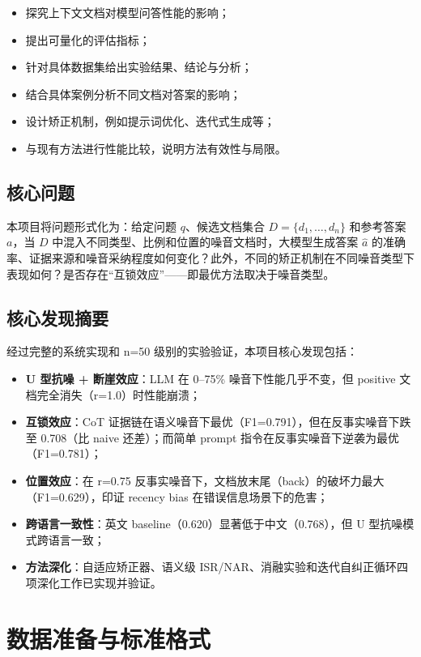 \documentclass[UTF8,zihao=-4]{ctexart}
\begin{document}
\begin{itemize}
  \item 探究上下文文档对模型问答性能的影响；
  \item 提出可量化的评估指标；
  \item 针对具体数据集给出实验结果、结论与分析；
  \item 结合具体案例分析不同文档对答案的影响；
  \item 设计矫正机制，例如提示词优化、迭代式生成等；
  \item 与现有方法进行性能比较，说明方法有效性与局限。
\end{itemize}

\subsection{核心问题}
本项目将问题形式化为：给定问题 $q$、候选文档集合 $D=\{d_1,\dots,d_n\}$ 和参考答案 $a$，当 $D$ 中混入不同类型、比例和位置的噪音文档时，大模型生成答案 $\hat{a}$ 的准确率、证据来源和噪音采纳程度如何变化？此外，不同的矫正机制在不同噪音类型下表现如何？是否存在“互锁效应”——即最优方法取决于噪音类型。

\subsection{核心发现摘要}
经过完整的系统实现和 n=50 级别的实验验证，本项目核心发现包括：

\begin{itemize}
  \item \textbf{U 型抗噪 + 断崖效应}：LLM 在 0--75\% 噪音下性能几乎不变，但 positive 文档完全消失（r=1.0）时性能崩溃；
  \item \textbf{互锁效应}：CoT 证据链在语义噪音下最优（F1=0.791），但在反事实噪音下跌至 0.708（比 naive 还差）；而简单 prompt 指令在反事实噪音下逆袭为最优（F1=0.781）；
  \item \textbf{位置效应}：在 r=0.75 反事实噪音下，文档放末尾（back）的破坏力最大（F1=0.629），印证 recency bias 在错误信息场景下的危害；
  \item \textbf{跨语言一致性}：英文 baseline（0.620）显著低于中文（0.768），但 U 型抗噪模式跨语言一致；
  \item \textbf{方法深化}：自适应矫正器、语义级 ISR/NAR、消融实验和迭代自纠正循环四项深化工作已实现并验证。
\end{itemize}

\section{数据准备与标准格式}
\end{document}
